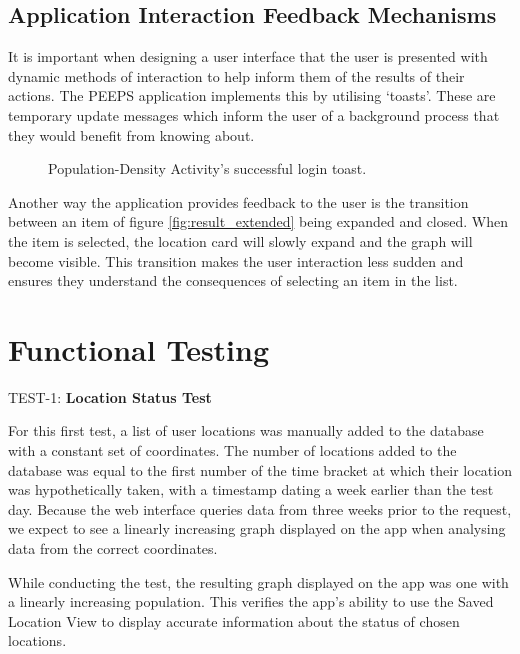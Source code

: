 \subsection{Application Interaction Feedback Mechanisms}
It is important when designing a user interface that the user is presented with dynamic methods of interaction to help inform them of the results of their actions. The PEEPS application implements this by utilising `toasts'. These are temporary update messages which inform the user of a background process that they would benefit from knowing about. 

\begin{figure}[ht]
    \centering
    \caption{Population-Density Activity's successful login toast.}
    \label{fig:result_toast}
\end{figure}

Another way the application provides feedback to the user is the transition between an item of figure \ref{fig:result_extended} being expanded and closed. When the item is selected, the location card will slowly expand and the graph will become visible. This transition makes the user interaction less sudden and ensures they understand the consequences of selecting an item in the list.

\section{Functional Testing}
TEST-1: \textbf{Location Status Test}

For this first test, a list of user locations was manually added to the database with a constant set of coordinates. The number of locations added to the database was equal to the first number of the time bracket at which their location was hypothetically taken, with a timestamp dating a week earlier than the test day. Because the web interface queries data from three weeks prior to the request, we expect to see a linearly increasing graph displayed on the app when analysing data from the correct coordinates.

While conducting the test, the resulting graph displayed on the app was one with a linearly increasing population. This verifies the app's ability to use the Saved Location View to display accurate information about the status of chosen locations.

